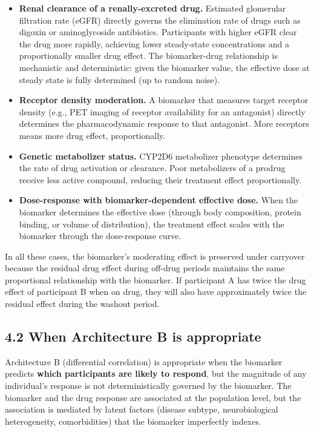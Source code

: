 \documentclass[
]{article}
\begin{document}
\begin{itemize}
\item \textbf{Renal clearance of a renally-excreted drug.} Estimated
  glomerular filtration rate (eGFR) directly governs the
  elimination rate of drugs such as digoxin or aminoglycoside
  antibiotics. Participants with higher eGFR clear the drug more
  rapidly, achieving lower steady-state concentrations and a
  proportionally smaller drug effect. The biomarker-drug
  relationship is mechanistic and deterministic: given the
  biomarker value, the effective dose at steady state is fully
  determined (up to random noise).

\item \textbf{Receptor density moderation.} A biomarker that measures
  target receptor density (e.g., PET imaging of receptor
  availability for an antagonist) directly determines the
  pharmacodynamic response to that antagonist. More receptors
  means more drug effect, proportionally.

\item \textbf{Genetic metabolizer status.} CYP2D6 metabolizer phenotype
  determines the rate of drug activation or clearance. Poor
  metabolizers of a prodrug receive less active compound,
  reducing their treatment effect proportionally.

\item \textbf{Dose-response with biomarker-dependent effective dose.}
  When the biomarker determines the effective dose (through
  body composition, protein binding, or volume of distribution),
  the treatment effect scales with the biomarker through the
  dose-response curve.
\end{itemize}

In all these cases, the biomarker's moderating effect is
preserved under carryover because the residual drug effect during
off-drug periods maintains the same proportional relationship
with the biomarker. If participant A has twice the drug effect of
participant B when on drug, they will also have approximately
twice the residual effect during the washout period.

\subsection{4.2 When Architecture B is appropriate}

Architecture B (differential correlation) is appropriate when
the biomarker predicts \textbf{which participants are likely to
respond}, but the magnitude of any individual's response is not
deterministically governed by the biomarker. The biomarker and
the drug response are associated at the population level, but
the association is mediated by latent factors (disease subtype,
neurobiological heterogeneity, comorbidities) that the biomarker
imperfectly indexes.
\end{document}
